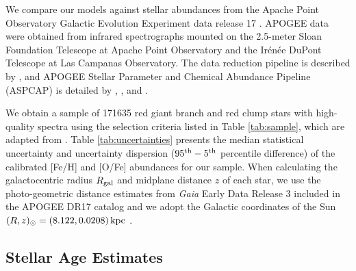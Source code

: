 \documentclass[twocolumn,twocolappendix,linenumbers]{aastex631}
\newcommand{\todo}[1]{{\color{red}#1}}
\newcommand{\kpc}{\,{\rm kpc}}
\begin{document}
% 

We compare our models against stellar abundances from the Apache Point Observatory Galactic Evolution Experiment \citep[APOGEE;][]{majewski_apache_2017} data release 17 \citep[DR17;][]{abdurrouf_seventeenth_2022}. APOGEE data were obtained from infrared spectrographs \citep{wilson_apache_2019} mounted on the 2.5-meter Sloan Foundation Telescope \citep{gunn_25_2006} at Apache Point Observatory and the Ir{\'e}n{\'e}e DuPont Telescope \citep{bowen_optical_1973} at Las Campanas Observatory. The data reduction pipeline is described by \citet{nidever_data_2015}, and APOGEE Stellar Parameter and Chemical Abundance Pipeline (ASPCAP) is detailed by \citet{holtzman_abundances_2015}, \citet{garcia_perez_aspcap_2016}, and \citet{jonsson_apogee_2020}.

We obtain a sample of \num{171635} red giant branch and red clump stars with high-quality spectra using the selection criteria listed in Table \ref{tab:sample}, which are adapted from \citet{hayden_chemical_2015}. Table \ref{tab:uncertainties} presents the median statistical uncertainty and uncertainty dispersion ($95^{\rm th} - 5^{\rm th}$ percentile difference) of the calibrated [Fe/H] and [O/Fe] abundances for our sample. When calculating the galactocentric radius $R_{\rm gal}$ and midplane distance $z$ of each star, we use the \citet{bailer-jones_estimating_2021} photo-geometric distance estimates from {\it Gaia} Early Data Release 3 \citep{gaia_collaboration_gaia_2016,gaia_collaboration_gaia_2021} included in the APOGEE DR17 catalog and we adopt the Galactic coordinates of the Sun $(R,z)_\odot=(8.122, 0.0208)\kpc$ \citep{gravity_collaboration_detection_2018,bennett_vertical_2019}. 

\subsection{Stellar Age Estimates}
\end{document}
